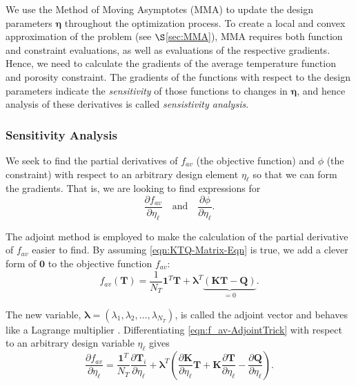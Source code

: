 We use the Method of Moving Asymptotes (MMA) to update the design parameters $\boldsymbol{\eta}$ throughout the optimization process. To create a local and convex approximation of the problem (see $\S$\ref{sec:MMA}), MMA requires both function and constraint evaluations, as well as evaluations of the respective gradients. Hence, we need to calculate the gradients of the average temperature function and porosity constraint. The gradients of the functions with respect to the design parameters indicate the \textit{sensitivity} of those functions to changes in $\boldsymbol{\eta}$, and hence analysis of these derivatives is called \textit{sensistivity analysis}.

\subsubsection*{Sensitivity Analysis}

We seek to find the partial derivatives of $f_{av}$ (the objective function) and $\phi$ (the constraint) with respect to an arbitrary design element $\eta_{\ell}$ so that we can form the gradients. That is, we are looking to find expressions for $$\displaystyle\frac{\partial f_{av}}{\partial\eta_\ell}\quad\text{and}\quad\displaystyle\frac{\partial\phi}{\partial\eta_\ell}.$$

The adjoint method is employed to make the calculation of the partial derivative of $f_{av}$ easier to find. By assuming \eqref{eqn:KTQ-Matrix-Eqn} is true, we add a clever form of $\mathbf{0}$ to the objective function $f_{av}$:
\begin{equation}
	f_{av}\left(\mathbf{T}\right)=\frac{1}{N_T}\mathbf{1}^T\mathbf{T}+\boldsymbol{\lambda}^T\underbrace{\left(\mathbf{K}\mathbf{T}-\mathbf{Q}\right)}_{=0}.\label{eqn:f_av-AdjointTrick}
\end{equation}

The new variable, $\boldsymbol{\lambda}=\left(\lambda_1,\lambda_2,\ldots,\lambda_{N_T}\right)$, is called the adjoint vector and behaves like a Lagrange multiplier \cite{Johnson2021}. Differentiating \eqref{eqn:f_av-AdjointTrick} with respect to an arbitrary design variable $\eta_\ell$ gives
\begin{equation}
	\frac{\partial f_{av}}{\partial\eta_{\ell}}=\frac{\mathbf{1}^T}{N_T}\frac{\partial\mathbf{T}_i}{\partial\eta_{\ell}}+\boldsymbol{\lambda}^T\left(\frac{\partial\mathbf{K}}{\partial\eta_{\ell}}\mathbf{T}+\mathbf{K}\frac{\partial\mathbf{T}}{\partial\eta_{\ell}}-\frac{\partial\mathbf{Q}}{\partial\eta_{\ell}}\right).\label{df_av/deta}
\end{equation}

